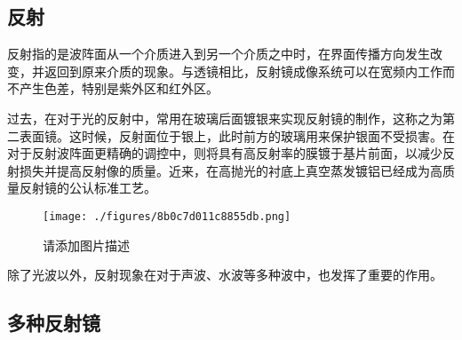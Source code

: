 \begin{issues}
\issueDraft
\issueMissDepend
\end{issues}

\subsection{反射}
反射指的是波阵面从一个介质进入到另一个介质之中时，在界面传播方向发生改变，并返回到原来介质的现象。与透镜相比，反射镜成像系统可以在宽频内工作而不产生色差，特别是紫外区和红外区。

过去，在对于光的反射中，常用在玻璃后面镀银来实现反射镜的制作，这称之为第二表面镜。这时候，反射面位于银上，此时前方的玻璃用来保护银面不受损害。在对于反射波阵面更精确的调控中，则将具有高反射率的膜镀于基片前面，以减少反射损失并提高反射像的质量。近来，在高抛光的衬底上真空蒸发镀铝已经成为高质量反射镜的公认标准工艺。
\begin{figure}[ht]
\centering
\texttt{[image: ./figures/8b0c7d011c8855db.png]}
\caption{请添加图片描述} \label{fig_RefMir_2}
\end{figure}

除了光波以外，反射现象在对于声波、水波等多种波中，也发挥了重要的作用。
\subsection{多种反射镜}

